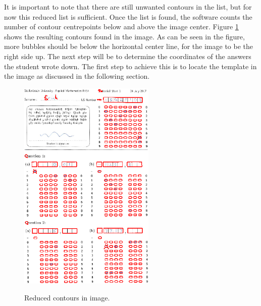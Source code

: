 It is important to note that there are still unwanted contours in the list, but for now this reduced list is sufficient. Once the list is found, the software counts the number of contour centrepoints below and above the image center. Figure \ref{fig:reduced} shows the resulting contours found in the image. As can be seen in the figure, more bubbles should be below the horizontal center line, for the image to be the right side up. The next step will be to determine the coordinates of the answers the student wrote down. The first step to achieve this is to locate the template in the image as discussed in the following section.

\begin{figure}
  \centering
  \includegraphics[width=6.5cm]{Reduced}\\
  \caption{Reduced contours in image.}
  \label{fig:reduced}
\end{figure}

